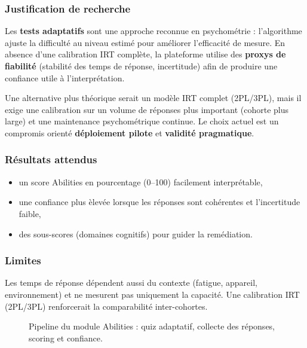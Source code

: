 \documentclass[11pt,a4paper]{article}
\begin{document}
\subsubsection*{Justification de recherche}
Les \textbf{tests adaptatifs} sont une approche reconnue en psychom\'etrie : l'algorithme ajuste la difficult\'e au niveau estim\'e pour am\'eliorer l'efficacit\'e de mesure. En absence d'une calibration IRT compl\`ete, la plateforme utilise des \textbf{proxys de fiabilit\'e} (stabilit\'e des temps de r\'eponse, incertitude) afin de produire une confiance utile \`a l'interpr\'etation.

 Une alternative plus \og th\'eorique \fg{} serait un mod\`ele IRT complet (2PL/3PL), mais il exige une calibration sur un volume de r\'eponses plus important (cohorte plus large) et une maintenance psychom\'etrique continue. Le choix actuel est un compromis orient\'e \textbf{d\'eploiement pilote} et \textbf{validit\'e pragmatique}.

\subsubsection*{R\'esultats attendus}
\begin{itemize}
    \item un score Abilities en pourcentage (0--100) facilement interpr\'etable,
    \item une confiance plus \`elev\'ee lorsque les r\'eponses sont coh\'erentes et l'incertitude faible,
    \item des sous-scores (domaines cognitifs) pour guider la rem\'ediation.
\end{itemize}

\subsubsection*{Limites}
Les temps de r\'eponse d\'ependent aussi du contexte (fatigue, appareil, environnement) et ne mesurent pas uniquement la capacit\'e. Une calibration IRT (2PL/3PL) renforcerait la comparabilit\'e inter-cohortes.

\begin{figure}[H]
    \centering
    
    \caption{Pipeline du module Abilities : quiz adaptatif, collecte des r\'eponses, scoring et confiance.}
    \label{fig:abilities_pipeline}
\end{figure}
\end{document}
